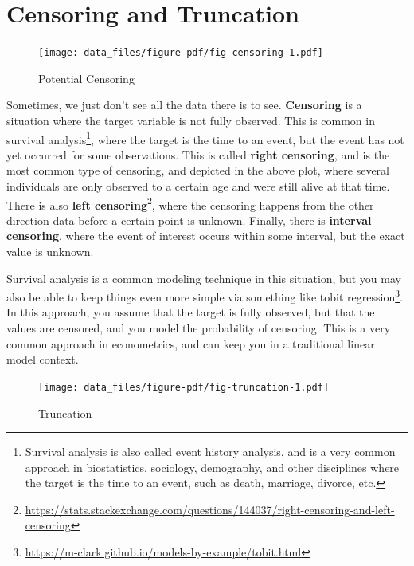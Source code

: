\documentclass[
  letterpaper,
]{krantz}
\DeclareRobustCommand{\href}[2]{#2\footnote{\url{#1}}}
\begin{document}
\section{Censoring and Truncation}\label{sec-data-censoring}

\begin{figure}

{\centering \texttt{[image: data\_files/figure-pdf/fig-censoring-1.pdf]}

}

\caption{\label{fig-censoring}Potential Censoring}

\end{figure}

Sometimes, we just don't see all the data there is to see.
\textbf{Censoring} is a situation where the target variable is not fully
observed. This is common in survival analysis\footnote{Survival analysis
  is also called event history analysis, and is a very common approach
  in biostatistics, sociology, demography, and other disciplines where
  the target is the time to an event, such as death, marriage, divorce,
  etc.}, where the target is the time to an event, but the event has not
yet occurred for some observations. This is called \textbf{right
censoring}, and is the most common type of censoring, and depicted in
the above plot, where several individuals are only observed to a certain
age and were still alive at that time. There is also
\href{https://stats.stackexchange.com/questions/144037/right-censoring-and-left-censoring}{\textbf{left
censoring}}, where the censoring happens from the other direction data
before a certain point is unknown. Finally, there is \textbf{interval
censoring}, where the event of interest occurs within some interval, but
the exact value is unknown.

Survival analysis is a common modeling technique in this situation, but
you may also be able to keep things even more simple via something like
\href{https://m-clark.github.io/models-by-example/tobit.html}{tobit
regression}. In this approach, you assume that the target is fully
observed, but that the values are censored, and you model the
probability of censoring. This is a very common approach in
econometrics, and can keep you in a traditional linear model context.

\begin{figure}

{\centering \texttt{[image: data\_files/figure-pdf/fig-truncation-1.pdf]}

}

\caption{\label{fig-truncation}Truncation}

\end{figure}
\end{document}
